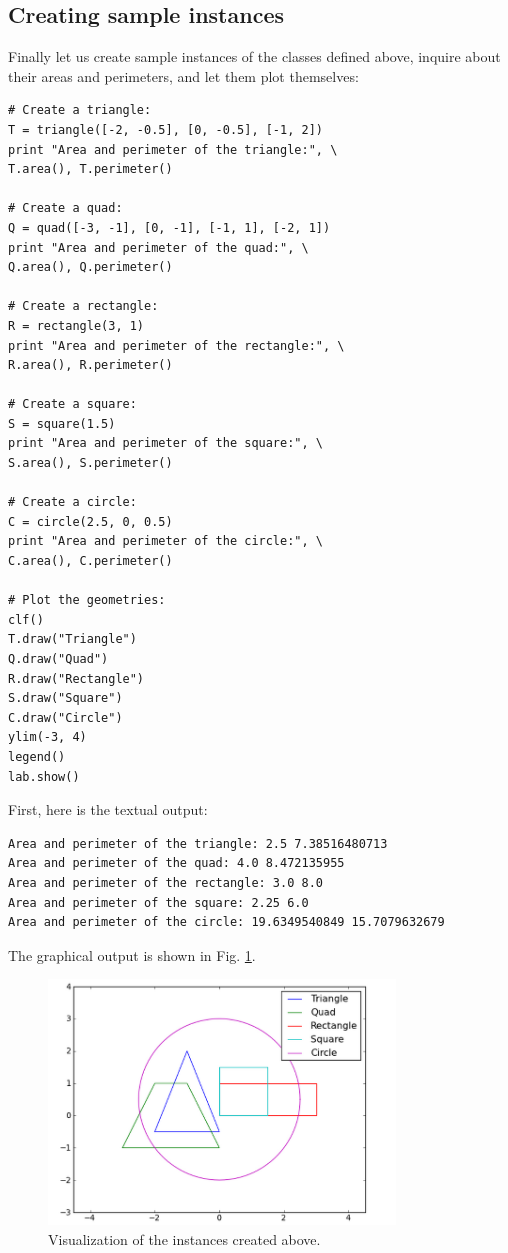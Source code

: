 \subsection{Creating sample instances}

Finally let us create sample instances of the classes defined above, inquire
about their areas and perimeters, and let them plot themselves:

\begin{verbatim}
# Create a triangle:
T = triangle([-2, -0.5], [0, -0.5], [-1, 2])
print "Area and perimeter of the triangle:", \
T.area(), T.perimeter()

# Create a quad:
Q = quad([-3, -1], [0, -1], [-1, 1], [-2, 1])
print "Area and perimeter of the quad:", \
Q.area(), Q.perimeter()
 
# Create a rectangle:
R = rectangle(3, 1)
print "Area and perimeter of the rectangle:", \
R.area(), R.perimeter()

# Create a square:
S = square(1.5)
print "Area and perimeter of the square:", \
S.area(), S.perimeter()
 
# Create a circle:
C = circle(2.5, 0, 0.5)
print "Area and perimeter of the circle:", \
C.area(), C.perimeter()

# Plot the geometries:
clf()
T.draw("Triangle")
Q.draw("Quad")
R.draw("Rectangle")
S.draw("Square")
C.draw("Circle")
ylim(-3, 4)
legend()
lab.show()
\end{verbatim}
First, here is the textual output:

\begin{verbatim}
Area and perimeter of the triangle: 2.5 7.38516480713
Area and perimeter of the quad: 4.0 8.472135955
Area and perimeter of the rectangle: 3.0 8.0
Area and perimeter of the square: 2.25 6.0
Area and perimeter of the circle: 19.6349540849 15.7079632679
\end{verbatim}
The graphical output is shown in Fig. \ref{fig:classes2}.

\begin{figure}[!ht]
\begin{center}
\includegraphics[width=0.82\textwidth]{imgp/classes2.png}
\end{center}
\vspace{-2mm}
\caption{Visualization of the instances created above.}
\label{fig:classes2}
\end{figure}


